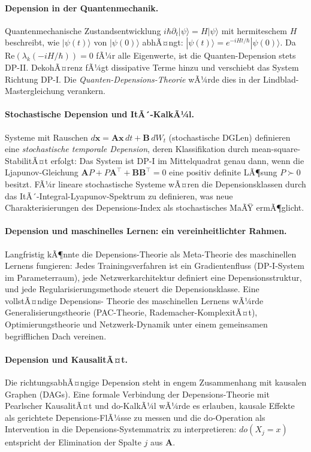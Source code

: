 ﻿\documentclass[12pt, a4paper]{article}
\theoremstyle{definition}
\theoremstyle{remark}
\newcommand{\vx}{\bm{x}}
\newcommand{\vA}{\bm{A}}
\newcommand{\vB}{\bm{B}}
\newcommand{\T}{\top}
\newcommand{\re}{\mathrm{Re}}
\begin{document}
\paragraph{Depension in der Quantenmechanik.}
Quantenmechanische Zustandsentwicklung $i\hbar\partial_t|\psi\rangle = H|\psi\rangle$
mit hermiteschem $H$ beschreibt, wie $|\psi(t)\rangle$ von $|\psi(0)\rangle$ abhÃ¤ngt:
$|\psi(t)\rangle = e^{-iHt/\hbar}|\psi(0)\rangle$. Da $\re(\lambda_k({-}iH/\hbar))=0$
fÃ¼r alle Eigenwerte, ist die Quanten-Depension stets DP-II. DekohÃ¤renz
fÃ¼gt dissipative Terme hinzu und verschiebt das System Richtung DP-I.
Die \emph{Quanten-Depensions-Theorie} wÃ¼rde dies in der
Lindblad-Mastergleichung verankern.

\paragraph{Stochastische Depension und ItÃ´-KalkÃ¼l.}
Systeme mit Rauschen $d\vx = \vA\vx\,dt + \vB\,dW_t$ (stochastische DGLen) definieren
eine \emph{stochastische temporale Depension}, deren Klassifikation durch
mean-square-StabilitÃ¤t erfolgt: Das System ist DP-I im Mittelquadrat genau dann, wenn
die Ljapunov-Gleichung $\vA P + P\vA^\T + \vB\vB^\T = 0$ eine positiv definite LÃ¶sung
$P \succ 0$ besitzt. FÃ¼r lineare stochastische Systeme wÃ¤ren die Depensionsklassen
durch das ItÃ´-Integral-Lyapunov-Spektrum zu definieren, was neue Charakterisierungen
des Depensions-Index als stochastisches MaÃŸ ermÃ¶glicht.

\paragraph{Depension und maschinelles Lernen: ein vereinheitlichter Rahmen.}
Langfristig kÃ¶nnte die Depensions-Theorie als Meta-Theorie des maschinellen Lernens
fungieren: Jedes Trainingsverfahren ist ein Gradientenfluss (DP-I-System im
Parameterraum), jede Netzwerkarchitektur definiert eine Depensionsstruktur, und jede
Regularisierungsmethode steuert die Depensionsklasse. Eine vollstÃ¤ndige Depensions-
Theorie des maschinellen Lernens wÃ¼rde Generalisierungstheorie (PAC-Theorie,
Rademacher-KomplexitÃ¤t), Optimierungstheorie und Netzwerk-Dynamik unter einem
gemeinsamen begrifflichen Dach vereinen.

\paragraph{Depension und KausalitÃ¤t.}
Die richtungsabhÃ¤ngige Depension steht in engem Zusammenhang mit kausalen Graphen
(DAGs). Eine formale Verbindung der Depensions-Theorie mit Pearlscher KausalitÃ¤t und
do-KalkÃ¼l wÃ¼rde es erlauben, kausale Effekte als gerichtete Depensions-FlÃ¼sse zu
messen und die do-Operation als Intervention in die Depensions-Systemmatrix zu
interpretieren: $do(X_j = x)$ entspricht der Elimination der Spalte $j$ aus $\vA$.
\end{document}
